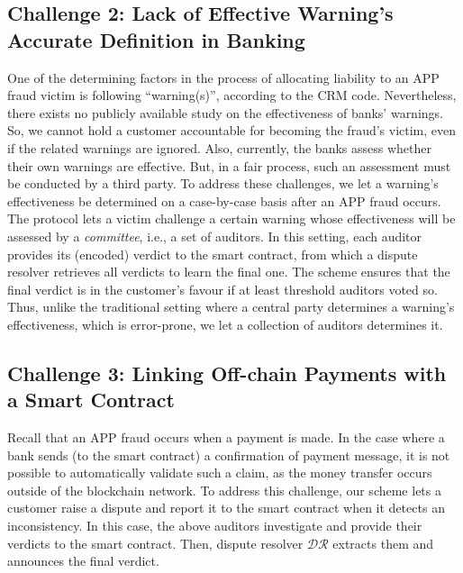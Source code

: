 


\vspace{-3mm}
\subsection{Challenge 2: Lack of Effective Warning's Accurate Definition in Banking}\label{sec::Lack-of-Effective-Warning-Definition}


One of the determining factors in the process of allocating liability to an APP fraud victim is following ``warning(s)'', according to the CRM code. Nevertheless, there exists no publicly available study on the effectiveness of banks' warnings. So, we cannot hold a customer accountable for becoming the fraud's victim,  even if the related warnings are ignored. Also, currently, the banks assess whether their own warnings are effective. But, in a fair process, such an assessment must be conducted by a third party.  To address these challenges, we let a warning's effectiveness be determined on a case-by-case basis after an APP fraud occurs. The protocol lets a victim challenge a certain warning whose effectiveness will be assessed by a \emph{committee}, i.e., a  set of auditors. In this setting, each auditor provides its (encoded) verdict to the smart contract, from which a dispute resolver retrieves all verdicts to learn the final one. The scheme ensures that the final verdict is in the customer's favour if at least threshold auditors voted so. Thus, unlike the traditional setting where a central party determines a warning's effectiveness, which is error-prone, we let a collection of auditors determines it.



\vspace{-3.5mm}

\subsection{Challenge 3: Linking Off-chain Payments with a Smart Contract}\label{sec::Linking Off-chain-Payments-with-contract}
 Recall that an APP fraud occurs when a payment is made. In the case where a  bank sends  (to the smart contract) a confirmation of payment message, it is not possible to automatically validate such a claim, as the money transfer occurs outside of the blockchain network. To address this challenge, our scheme lets a customer raise a dispute and report it to the smart contract when it detects an inconsistency. In this case, the above auditors investigate and provide their verdicts to the smart contract. Then, dispute resolver $\mathcal{DR}$ extracts them and announces the final verdict. 



